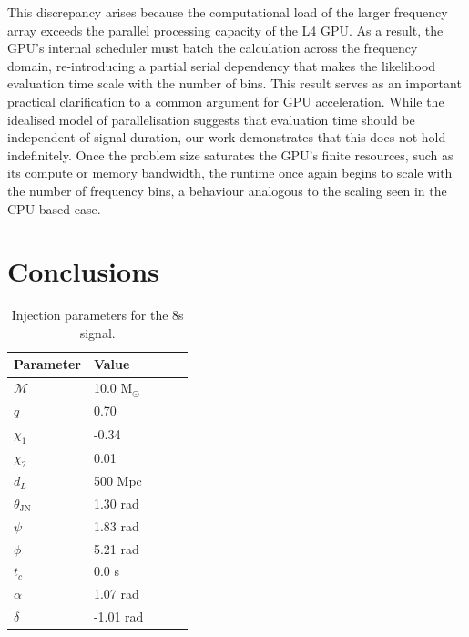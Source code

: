 \documentclass[fleqn,usenatbib]{mnras}
\begin{document}
This discrepancy arises because the computational load of the larger
frequency array exceeds the parallel processing capacity of the L4 GPU.
As a result, the GPU's internal scheduler must batch the calculation
across the frequency domain, re-introducing a partial serial dependency
that makes the likelihood evaluation time scale with the number of bins.
This result serves as an important practical clarification to a common
argument for GPU acceleration. While the idealised model of
parallelisation suggests that evaluation time should be independent of
signal duration, our work demonstrates that this does not hold
indefinitely. Once the problem size saturates the GPU's finite
resources, such as its compute or memory bandwidth, the runtime once
again begins to scale with the number of frequency bins, a behaviour
analogous to the scaling seen in the CPU-based case.


\section{Conclusions}
\label{sec:conclusions}

\begin{table}
    \centering
    \caption{Injection parameters for the 8s signal.}
    \label{tab:8s_injection_params}
    \begin{tabular}{l l l c c}
    \hline
    \hline
    \textbf{Parameter} & \textbf{Value} \\
    \hline
    $\mathcal{M}$ & 10.0 M$_{\odot}$ \\
    $q$ & 0.70 \\
    $\chi_1$ & -0.34 \\
    $\chi_2$ & 0.01 \\
    $d_L$ & 500 Mpc \\
    $\theta_{\textrm{JN}}$ & 1.30 rad \\
    $\psi$ & 1.83 rad \\
    $\phi$ & 5.21 rad \\
    $t_c$ & 0.0 s\\
    $\alpha$ & 1.07 rad \\
    $\delta$ & -1.01 rad \\
    \hline
    \hline
    \end{tabular}
    \end{table}
\end{document}
